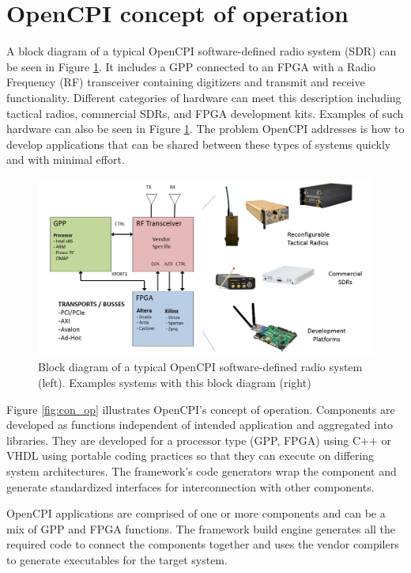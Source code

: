 \section*{OpenCPI concept of operation}
A block diagram of a typical OpenCPI software-defined radio system (SDR) can be seen in Figure \ref{fig:sdr_block_diagram}. It includes a GPP connected to an FPGA with a Radio Frequency (RF) transceiver containing digitizers and transmit and receive functionality. Different categories of hardware can meet this description including tactical radios, commercial SDRs, and FPGA development kits. Examples of such hardware can also be seen in Figure \ref{fig:sdr_block_diagram}. The problem OpenCPI addresses is how to develop applications that can be shared between these types of systems quickly and with minimal effort.\par
\begin{figure}[ht]
        \centering
        \includegraphics[scale=0.4]{./figures/sdr_block_diagram.png}
        \caption{Block diagram of a typical OpenCPI software-defined radio system (left). Examples systems with this block diagram (right)}
        \label{fig:sdr_block_diagram}
\end{figure}
\newpage
Figure \ref{fig:con_op} illustrates OpenCPI's concept of operation. Components are developed as functions independent of intended application and aggregated into libraries. They are developed for a processor type (GPP, FPGA) using C++ or VHDL using portable coding practices so that they can execute on differing system architectures. The framework's code generators wrap the component and generate standardized interfaces for interconnection with other components.\par
OpenCPI applications are comprised of one or more components and can be a mix of GPP and FPGA functions. The framework build engine generates all the required code to connect the components together and uses the vendor compilers to generate executables for the target system.\par
